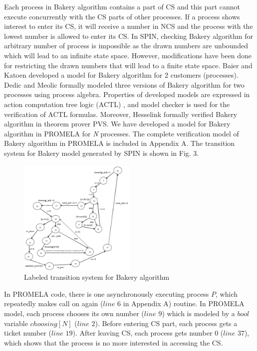 \documentclass[conference]{IEEEtran}
\begin{document}
Each process in Bakery algorithm contains a part of CS and this part cannot execute concurrently with the CS parts of other processes. 
If a process shows interest to enter its CS, it will receive a number in NCS and the process with the lowest number is allowed to enter its CS. 
In SPIN, checking Bakery algorithm for arbitrary number of process is impossible as the drawn numbers are unbounded which will lead to an infinite 
state space. However, modifications have been done for restricting the drawn numbers that will lead to a finite state space. Baier and Katoen 
\cite{33} developed a model for Bakery algorithm for 2 customers (processes). Dedic and Meolic \cite{19} formally modeled three versions of Bakery
algorithm for two processes using process algebra. Properties of developed models are expressed in action computation tree logic (ACTL) \cite{21}, 
and model checker is used for the verification of ACTL formulas. Moreover, Hesselink \cite{34} formally verified Bakery algorithm in theorem prover 
PVS. We have developed a model for Bakery algorithm in PROMELA for \emph{N} processes. The complete verification model of Bakery algorithm in 
PROMELA is included in Appendix A. The transition system for Bakery model generated by SPIN is shown in Fig. 3.
\begin{figure}[!ht]
\includegraphics[width=0.5\textwidth]{bakerymodel}
\caption{Labeled transition system for Bakery algorithm} 
\end{figure}

In PROMELA code, there is one asynchronously executing process $P$, which repeatedly makes call on again ($line$ $6$ in Appendix A) routine. 
In PROMELA model, each process chooses its own number ($line$ $9$) which is modeled by a $bool$ variable $choosing[N]$ ($line$ $2$). Before 
entering CS part,
each process gets a ticket number ($line$ $19$). After leaving CS, each process gets number 0 ($line$ $37$), which shows that the process is no more 
interested in accessing the CS.
\end{document}
